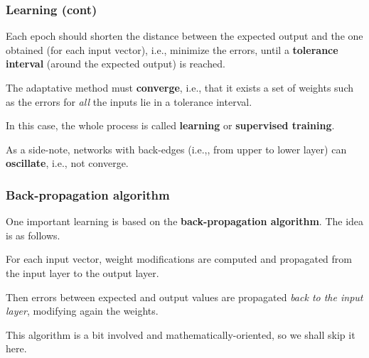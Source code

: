 %
\begin{frame}
\frametitle{Learning (cont)}

Each epoch should shorten the distance between the expected output and
the one obtained (for each input vector), i.e., minimize the errors,
until a \textbf{tolerance interval} (around the expected output) is
reached.

\bigskip

The adaptative method must \textbf{converge}, i.e., that it exists a
set of weights such as the errors for \emph{all} the inputs lie in a
tolerance interval.

\bigskip

In this case, the whole process is called \textbf{learning} or
\textbf{supervised training}.

\bigskip

As a side-note, networks with back-edges (i.e.,, from upper to lower
layer) can \textbf{oscillate}, i.e., not converge.

\end{frame}

%
\begin{frame}
\frametitle{Back-propagation algorithm}

One important learning is based on the \textbf{back-propagation
algorithm}. The idea is as follows.

\bigskip

For each input vector, weight modifications are computed and
propagated from the input layer to the output layer.

\bigskip

Then errors between expected and output values are propagated
\emph{back to the input layer}, modifying again the weights.

\bigskip

This algorithm is a bit involved and mathematically-oriented, so we
shall skip it here.

\end{frame}

